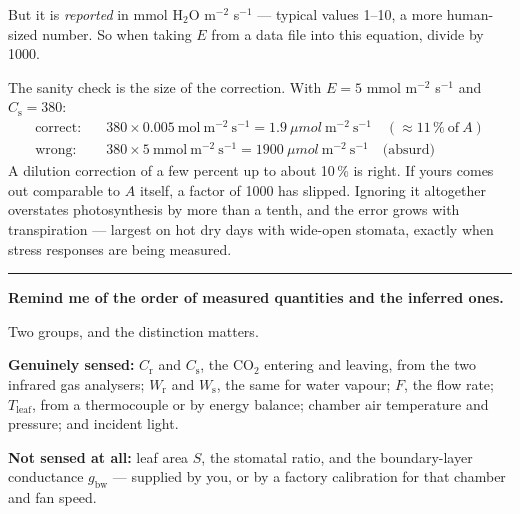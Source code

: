 \documentclass[11pt,letterpaper]{article}
\newcommand{\umol}{\ensuremath{\mu}mol}
\newcommand{\question}[1]{%
  \vspace{1.5em}%
  {\noindent\color{rulegray}\rule{\textwidth}{0.4pt}\par}%
  \vspace{0.7em}%
  {\noindent\color{accent}\bfseries #1\par}%
  \vspace{0.6em}%
}
\begin{document}
But it is \emph{reported} in mmol H$_2$O m$^{-2}$ s$^{-1}$ --- typical values
1--10, a more human-sized number. So when taking $E$ from a data file into this
equation, divide by 1000.

The sanity check is the size of the correction. With $E = 5$ mmol m$^{-2}$
s$^{-1}$ and $C_{\mathrm{s}} = 380$:
\begin{align*}
\text{correct:}\quad & 380 \times 0.005\ \mathrm{mol\ m^{-2}\ s^{-1}} = 1.9\ \umol\ \mathrm{m^{-2}\ s^{-1}} \quad (\approx 11\,\%\ \text{of}\ A)\\
\text{wrong:}\quad   & 380 \times 5\ \mathrm{mmol\ m^{-2}\ s^{-1}} = 1900\ \umol\ \mathrm{m^{-2}\ s^{-1}} \quad \text{(absurd)}
\end{align*}
A dilution correction of a few percent up to about 10\,\% is right. If yours
comes out comparable to $A$ itself, a factor of 1000 has slipped. Ignoring it
altogether overstates photosynthesis by more than a tenth, and the error grows
with transpiration --- largest on hot dry days with wide-open stomata, exactly
when stress responses are being measured.

\question{Remind me of the order of measured quantities and the inferred ones.}

Two groups, and the distinction matters.

\textbf{Genuinely sensed:} $C_{\mathrm{r}}$ and $C_{\mathrm{s}}$, the CO$_2$
entering and leaving, from the two infrared gas analysers; $W_{\mathrm{r}}$ and
$W_{\mathrm{s}}$, the same for water vapour; $F$, the flow rate;
$T_{\mathrm{leaf}}$, from a thermocouple or by energy balance; chamber air
temperature and pressure; and incident light.

\textbf{Not sensed at all:} leaf area $S$, the stomatal ratio, and the
boundary-layer conductance $g_{\mathrm{bw}}$ --- supplied by you, or by a
factory calibration for that chamber and fan speed.
\end{document}
